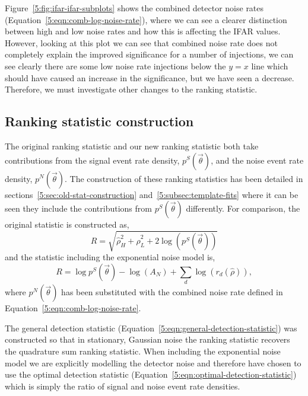 Figure~\ref{5:fig:ifar-ifar-subplots} shows the combined detector noise rates (Equation~\ref{5:eqn:comb-log-noise-rate}), where we can see a clearer distinction between high and low noise rates and how this is affecting the IFAR values. However, looking at this plot we can see that combined noise rate does not completely explain the improved significance for a number of injections, we can see clearly there are some low noise rate injections below the $y=x$ line which should have caused an increase in the significance, but we have seen a decrease. Therefore, we must investigate other changes to the ranking statistic.

\subsection{\label{5:sec:comparing-statistic-construction}Ranking statistic construction}

The original ranking statistic and our new ranking statistic both take contributions from the signal event rate density, $p^{S}(\Vec{\theta})$, and the noise event rate density, $p^{N}(\Vec{\theta})$. The construction of these ranking statistics has been detailed in sections~\ref{5:sec:old-stat-construction} and~\ref{5:subsec:template-fits} where it can be seen they include the contributions from $p^{S}(\Vec{\theta})$ differently. For comparison, the original statistic is constructed as,
%
\begin{equation}
    R = \sqrt{\hat{\rho}^{2}_{H} + \hat{\rho}^{2}_{L} + 2\log\left(p^{S}(\Vec{\theta})\right)}
    \label{5:eqn:original-statistic-repeat}
\end{equation}
%
and the statistic including the exponential noise model is,
%
\begin{equation}
    R = \log p^{S}(\Vec{\theta}) - \log\left(A_{N}\right) + \sum_{d} \log\left(r_{d}(\hat{\rho})\right),
    \label{5:eqn:new-statistic}
\end{equation}
%
where $p^{N}(\Vec{\theta})$ has been substituted with the combined noise rate defined in Equation~\ref{5:eqn:comb-log-noise-rate}.

The general detection statistic (Equation~\ref{5:eqn:general-detection-statistic}) was constructed so that in stationary, Gaussian noise the ranking statistic recovers the quadrature sum ranking statistic. When including the exponential noise model we are explicitly modelling the detector noise and therefore have chosen to use the optimal detection statistic (Equation~\ref{5:eqn:optimal-detection-statistic}) which is simply the ratio of signal and noise event rate densities.

